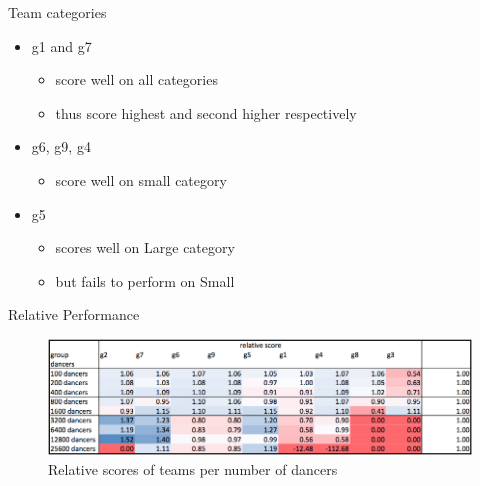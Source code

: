 \begin{frame}{Team categories}

\begin{itemize}
\tightlist
\item
  g1 and g7

  \begin{itemize}
  \tightlist
  \item
    score well on all categories
  \item
    thus score highest and second higher respectively
  \end{itemize}
\item
  g6, g9, g4

  \begin{itemize}
  \tightlist
  \item
    score well on small category
  \end{itemize}
\item
  g5

  \begin{itemize}
  \tightlist
  \item
    scores well on Large category
  \item
    but fails to perform on Small
  \end{itemize}
\end{itemize}

\end{frame}

\begin{frame}{Relative Performance}

\begin{figure}[htbp]
\centering
\includegraphics{imgs/team-rel.png}
\caption{Relative scores of teams per number of dancers\label{team-rel}}
\end{figure}

\end{frame}

